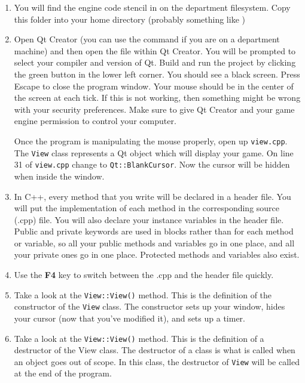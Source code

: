 \documentclass{cs195u}
\begin{document}
\begin{enumerate}
\item You will find the engine code stencil in  on the department filesystem. Copy this folder into your home directory (probably something like )

\item Open Qt Creator (you can use the command  if you are on a department machine) and then open the  file within Qt Creator. You will be prompted to select your compiler and version of Qt. Build and run the project by clicking the green button in the lower left corner. You should see a black screen. Press Escape to close the program window. Your mouse should be in the center of the screen at each tick. If this is not working, then something might be wrong with your security preferences. Make sure to give Qt Creator and your game engine permission to control your computer.

Once the program is manipulating the mouse properly, open up \texttt{view.cpp}. The \texttt{View} class represents a Qt object which will display your game. On line 31 of \texttt{view.cpp} change  to \texttt{Qt::BlankCursor}. Now the cursor will be hidden when inside the window.

\item In C++, every method that you write will be declared in a header file. You will put the implementation of each method in the corresponding source (.cpp) file. You will also declare your instance variables in the header file. Public and private keywords are used in blocks rather than for each method or variable, so all your public methods and variables go in one place, and all your private ones go in one place. Protected methods and variables also exist.

\item Use the \textbf{F4} key to switch between the .cpp and the header file quickly.

\item Take a look at the \texttt{View::View()} method. This is the definition of the constructor of the \texttt{View} class. The constructor sets up your window, hides your cursor (now that you've modified it), and sets up a timer.

\item Take a look at the \texttt{View::View()} method. This is the definition of a destructor of the View class. The destructor of a class is what is called when an object goes out of scope. In this class, the destructor of \texttt{View} will be called at the end of the program.


\end{enumerate}
\end{document}
